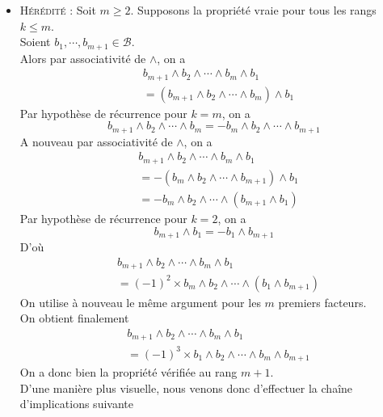 \documentclass[../geometrie.tex]{subfiles}
\begin{document}
{{\begin{itemize}
					et la propriété est vérifiée pour $m = 2$.
				\item[$\bullet$] \textsc{Hérédité} : Soit $m \geq 2$. Supposons la propriété vraie pour tous les rangs $k \leq m$. \\
					Soient $b_{1}, \cdots, b_{m+1} \in \mathcal{B}$. \\
					Alors par associativité de $\wedge$, on a
					$$
						\begin{aligned}
							& b_{m+1} \wedge b_{2} \wedge \cdots \wedge b_{m} \wedge b_{1} \\
							& = (b_{m + 1} \wedge b_{2} \wedge \cdots \wedge b_{m}) \wedge b_{1}
						\end{aligned}
					$$
					Par hypothèse de récurrence pour $k = m$, on a
					$$
						b_{m + 1} \wedge b_{2} \wedge \cdots \wedge b_{m} = -b_{m} \wedge b_{2} \wedge \cdots \wedge b_{m + 1}
					$$
					A nouveau par associativité de $\wedge$, on a
					$$
						\begin{aligned}
							& b_{m+1} \wedge b_{2} \wedge \cdots \wedge b_{m} \wedge b_{1} \\
							& = - (b_{m} \wedge b_{2} \wedge \cdots \wedge b_{m + 1}) \wedge b_{1} \\
							& = - b_{m} \wedge b_{2} \wedge \cdots \wedge (b_{m + 1} \wedge b_{1})
						\end{aligned}
					$$
					Par hypothèse de récurrence pour $k = 2$, on a
					$$
						b_{m + 1} \wedge b_{1} = - b_{1} \wedge b_{m + 1}
					$$
					D'où
					$$
						\begin{aligned}
							& b_{m+1} \wedge b_{2} \wedge \cdots \wedge b_{m} \wedge b_{1} \\
							& = (-1)^{2} \times b_{m} \wedge b_{2} \wedge \cdots \wedge (b_{1} \wedge b_{m + 1})
						\end{aligned}
					$$
					On utilise à nouveau le même argument pour les $m$ premiers facteurs. \\
					On obtient finalement
					$$
						\begin{aligned}
							& b_{m+1} \wedge b_{2} \wedge \cdots \wedge b_{m} \wedge b_{1} \\
							& = (-1)^{3} \times b_{1} \wedge b_{2} \wedge \cdots \wedge b_{m} \wedge b_{m + 1}
						\end{aligned}
					$$
					On a donc bien la propriété vérifiée au rang $m + 1$. \\
					D'une manière plus visuelle, nous venons donc d'effectuer la \flqq{} chaîne d'implications \frqq{} suivante
					$$
						\begin{array}{c}

\end{array}$$
\end{itemize}}}
\end{document}
